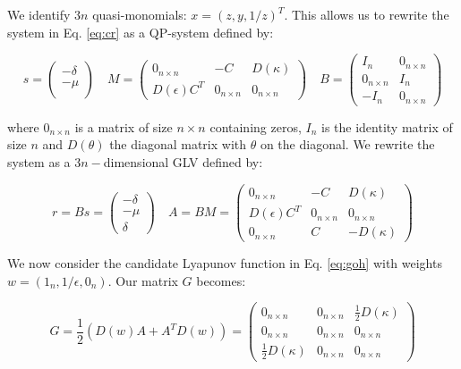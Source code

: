 \documentclass{article}
\begin{document}
We identify \(3n\) quasi-monomials: \(x = (z, y, 1 / z)^T\). This allows
us to rewrite the system in Eq. \ref{eq:cr} as a QP-system defined by:

\begin{equation}
\label{eq:crqp}
s = \begin{pmatrix}
-\delta \\
-\mu \\
\end{pmatrix} \quad 
M = \begin{pmatrix}
0_{n \times n} & -C & D(\kappa)\\
D(\epsilon)C^T & 0_{n \times n} & 0_{n \times n}
\end{pmatrix} \quad
B = \begin{pmatrix}
I_n & 0_{n \times n}\\
0_{n \times n} & I_n\\
-I_n & 0_{n \times n}
\end{pmatrix}
\end{equation}

where \(0_{n \times n}\) is a matrix of size \(n \times n\) containing
zeros, \(I_n\) is the identity matrix of size \(n\) and \(D(\theta)\)
the diagonal matrix with \(\theta\) on the diagonal. We rewrite the
system as a \(3n-\)dimensional GLV defined by:

\begin{equation}
r = B s = \begin{pmatrix}
-\delta \\
-\mu \\
\delta
\end{pmatrix} \quad
A = B M = \begin{pmatrix}
0_{n \times n} & -C & D(\kappa)\\
D(\epsilon) C^T & 0_{n \times n} & 0_{n \times n}\\
0_{n \times n} & C & -D(\kappa)
\end{pmatrix}
\end{equation}

We now consider the candidate Lyapunov function in Eq. \ref{eq:goh} with
weights \(w = (1_n, 1 / \epsilon, 0_n)\). Our matrix \(G\) becomes:

\begin{equation}
G = \frac{1}{2}(D(w) A + A^T D(w)) = \begin{pmatrix}
0_{n \times n} & 0_{n \times n} & \frac{1}{2} D(\kappa)\\
0_{n \times n} & 0_{n \times n} & 0_{n \times n}\\
\frac{1}{2} D(\kappa) & 0_{n \times n} & 0_{n \times n}
\end{pmatrix}
\end{equation}
\end{document}
